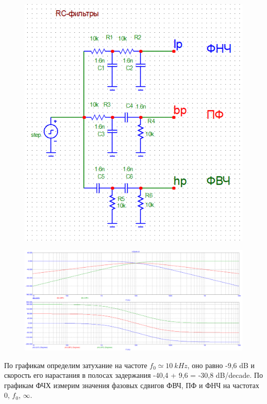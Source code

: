 \documentclass{article}
\begin{document}
\subsection{}

\begin{figure}[H]
\centering
\includegraphics[scale=0.4]{rc2pole_img.png}
\label{fig:Image1}
\end{figure}

\begin{figure}[H]
\centering
\includegraphics[scale=0.4]{rc2pole_AC.png}
\label{fig:Image1}
\end{figure}

По графикам определим затухание на частоте $f_0 \simeq 10 \: kHz$, оно равно -9,6 dB и скорость его нарастания в полосах задержания -40,4 + 9,6 = -30,8 dB/decade. По графикам  ФЧХ измерим значения фазовых сдвигов  ФВЧ, ПФ и ФНЧ на частотах 0, $f_0$, $\infty$.
\end{document}
